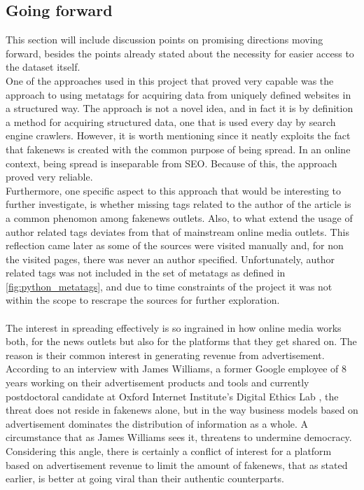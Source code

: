 \documentclass{article}
\begin{document}
\subsection{Going forward}
This section will include discussion points on promising directions moving forward, besides the points already stated about the necessity for easier access to the dataset itself. \\
One of the approaches used in this project that proved very capable was the approach to using metatags for acquiring data from uniquely defined websites in a structured way. The approach is not a novel idea, and in fact it is by definition a method for acquiring structured data, one that is used every day by search engine crawlers. However, it is worth mentioning since it neatly exploits the fact that fakenews is created with the common purpose of being spread. In an online context, being spread is inseparable from SEO. Because of this, the approach proved very reliable.
\\
Furthermore, one specific aspect to this approach that would be interesting to further investigate, is whether missing tags related to the author of the article is a common phenomon among fakenews outlets. Also, to what extend the usage of author related tags deviates from that of mainstream online media outlets. This reflection came later as some of the sources were visited manually and, for non the visited pages, there was never an author specified. Unfortunately, author related tags was not included in the set of metatags as defined in \cref{fig:python_metatags}, and due to time constraints of the project it was not within the scope to rescrape the sources for further exploration.
\\\\
The interest in spreading effectively is so ingrained in how online media works both, for the news outlets but also for the platforms that they get shared on. The reason is their common interest in generating revenue from advertisement. According to an interview with James Williams, a former Google employee of 8 years working on their advertisement products and tools and currently postdoctoral candidate at Oxford Internet Institute's Digital Ethics Lab \cite{jamesfuckingwilliamseveryone}, the threat does not reside in fakenews alone, but in the way business models based on advertisement dominates the distribution of information as a whole. A circumstance that as James Williams sees it, threatens to undermine democracy. Considering this angle, there is certainly a conflict of interest for a platform based on advertisement revenue to limit the amount of fakenews, that as stated earlier, is better at going viral than their authentic counterparts.
\end{document}
